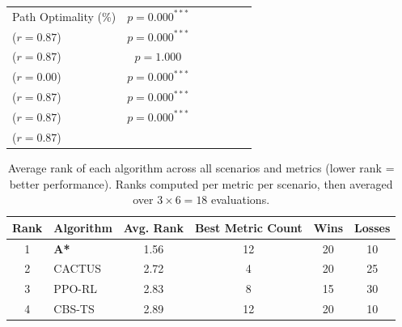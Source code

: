 \documentclass[review]{elsarticle}
\begin{document}
\begin{table}[htbp]
\begin{tabular}{@{}lcccccc@{}}
Path Optimality (\%) & $p=0.000^{***}$\\($r=0.87$) & $p=0.000^{***}$\\($r=0.87$) & $p=1.000$\\($r=0.00$) & $p=0.000^{***}$\\($r=0.87$) & $p=0.000^{***}$\\($r=0.87$) & $p=0.000^{***}$\\($r=0.87$) \\
\bottomrule
\end{tabular}
\end{table}

\begin{table}[htbp]
\centering
\caption{Average rank of each algorithm across all scenarios and metrics (lower rank = better performance). Ranks computed per metric per scenario, then averaged over $3 \times 6 = 18$ evaluations.}
\label{tab:ranking}
\begin{tabular}{@{}clcccc@{}}
\toprule
\textbf{Rank} & \textbf{Algorithm} & \textbf{Avg. Rank} & \textbf{Best Metric Count} & \textbf{Wins} & \textbf{Losses} \\
\midrule
1 & \textbf{A*} & 1.56 & 12 & 20 & 10 \\
2 & CACTUS & 2.72 & 4 & 20 & 25 \\
3 & PPO-RL & 2.83 & 8 & 15 & 30 \\
4 & CBS-TS & 2.89 & 12 & 20 & 10 \\
\bottomrule
\end{tabular}
\end{table}
\end{document}
